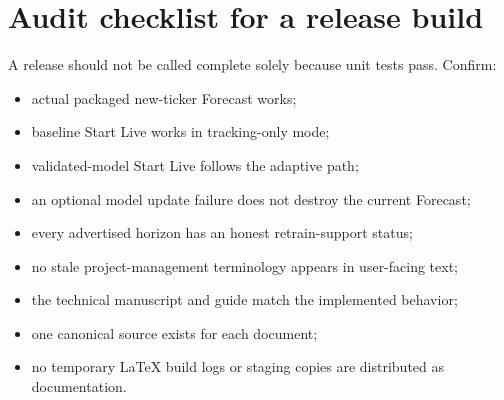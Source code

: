 \documentclass[11pt]{article}
\begin{document}
\section{Audit checklist for a release build}
A release should not be called complete solely because unit tests pass. Confirm:
\begin{itemize}[itemsep=0.15em]
\item actual packaged new-ticker Forecast works;
\item baseline Start Live works in tracking-only mode;
\item validated-model Start Live follows the adaptive path;
\item an optional model update failure does not destroy the current Forecast;
\item every advertised horizon has an honest retrain-support status;
\item no stale project-management terminology appears in user-facing text;
\item the technical manuscript and guide match the implemented behavior;
\item one canonical source exists for each document;
\item no temporary LaTeX build logs or staging copies are distributed as documentation.
\end{itemize}

\appendix
\end{document}
